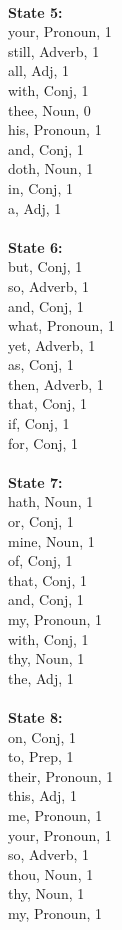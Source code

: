 \begin{multicols}{4}
\\
\textbf{State 5:} \\
your, Pronoun, 1\\
still, Adverb, 1\\
all, Adj, 1\\
with, Conj, 1\\
thee, Noun, 0\\
his, Pronoun, 1\\
and, Conj, 1\\
doth, Noun, 1\\
in, Conj, 1\\
a, Adj, 1\\
\\
\textbf{State 6:} \\
but, Conj, 1\\
so, Adverb, 1\\
and, Conj, 1\\
what, Pronoun, 1\\
yet, Adverb, 1\\
as, Conj, 1\\
then, Adverb, 1\\
that, Conj, 1\\
if, Conj, 1\\
for, Conj, 1\\
\\
\textbf{State 7:} \\
hath, Noun, 1\\
or, Conj, 1\\
mine, Noun, 1\\
of, Conj, 1\\
that, Conj, 1\\
and, Conj, 1\\
my, Pronoun, 1\\
with, Conj, 1\\
thy, Noun, 1\\
the, Adj, 1\\
\\
\textbf{State 8:} \\
on, Conj, 1\\
to, Prep, 1\\
their, Pronoun, 1\\
this, Adj, 1\\
me, Pronoun, 1\\
your, Pronoun, 1\\
so, Adverb, 1\\
thou, Noun, 1\\
thy, Noun, 1\\
my, Pronoun, 1\\

\end{multicols}
